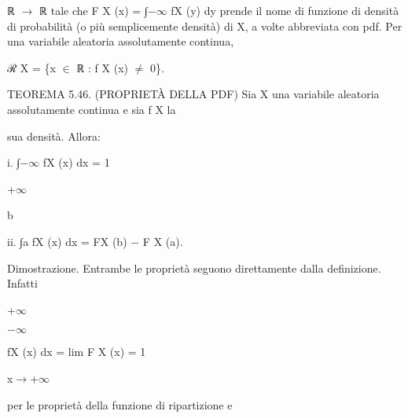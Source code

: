 \documentclass[a4paper,portrait,12pt]{article}
\begin{document}
\begin{flushleft}
ℝ $\rightarrow$ ℝ tale che F X (x) = ∫$-$$\infty$ fX (y) dy prende il nome di funzione di densit\`{a} di probabilit\`{a} (o più semplicemente densit\`{a}) di X, a volte abbreviata con pdf. Per una variabile aleatoria assolutamente continua,
\end{flushleft}


\begin{flushleft}
ℛ X = \{x $\in$ ℝ : f X (x) $\neq$ 0\}.
\end{flushleft}


\begin{flushleft}
TEOREMA 5.46. (PROPRIET\`{A} DELLA PDF) Sia X una variabile aleatoria assolutamente continua e sia f X la
\end{flushleft}


\begin{flushleft}
sua densit\`{a}. Allora:
\end{flushleft}


\begin{flushleft}
i. ∫$-$$\infty$ fX (x) dx = 1
\end{flushleft}


+$\infty$


\begin{flushleft}
b
\end{flushleft}





\begin{flushleft}
ii. ∫a fX (x) dx = FX (b) $-$ F X (a).
\end{flushleft}


\begin{flushleft}
Dimostrazione. Entrambe le propriet\`{a} seguono direttamente dalla definizione. Infatti
\end{flushleft}


+$\infty$


$-$$\infty$





\begin{flushleft}
fX (x) dx = lim F X (x) = 1
\end{flushleft}


\begin{flushleft}
x$\rightarrow$+$\infty$
\end{flushleft}





\begin{flushleft}
per le propriet\`{a} della funzione di ripartizione e
\end{flushleft}
\end{document}
